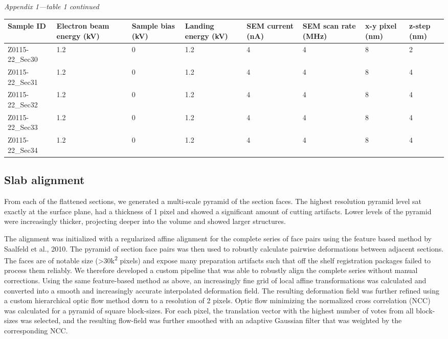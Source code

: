 \documentclass{article}
\begin{document}
\noindent\emph{Appendix 1—table 1 continued}
\begin{center}\footnotesize
\begin{longtable}{p{1.3cm}p{1.3cm}p{1.1cm}p{1.2cm}p{1.2cm}p{1.3cm}p{1cm}p{0.9cm}}
\textbf{Sample ID} & \textbf{Electron beam energy (kV)} & \textbf{Sample bias (kV)} & \textbf{Landing energy (kV)} & \textbf{SEM current (nA)} & \textbf{SEM scan rate (MHz)} & \textbf{x-y pixel (nm)} & \textbf{z-step (nm)} \\
\hline
Z0115-22\_Sec30 & 1.2 & 0 & 1.2 & 4 & 4 & 8 & 2 \\
Z0115-22\_Sec31 & 1.2 & 0 & 1.2 & 4 & 4 & 8 & 4 \\
Z0115-22\_Sec32 & 1.2 & 0 & 1.2 & 4 & 4 & 8 & 4 \\
Z0115-22\_Sec33 & 1.2 & 0 & 1.2 & 4 & 4 & 8 & 4 \\
Z0115-22\_Sec34 & 1.2 & 0 & 1.2 & 4 & 4 & 8 & 4 \\
\end{longtable}
\end{center}

\subsection*{Slab alignment}

From each of the flattened sections, we generated a multi-scale pyramid of the section faces. The highest resolution pyramid level sat exactly at the surface plane, had a thickness of 1 pixel and showed a significant amount of cutting artifacts. Lower levels of the pyramid were increasingly thicker, projecting deeper into the volume and showed larger structures.

The alignment was initialized with a regularized affine alignment for the complete series of face pairs using the feature based method by Saalfeld et al., 2010. The pyramid of section face pairs was then used to robustly calculate pairwise deformations between adjacent sections. The faces are of notable size (>30k\textsuperscript{2} pixels) and expose many preparation artifacts such that off the shelf registration packages failed to process them reliably. We therefore developed a custom pipeline that was able to robustly align the complete series without manual corrections. Using the same feature-based method as above, an increasingly fine grid of local affine transformations was calculated and converted into a smooth and increasingly accurate interpolated deformation field. The resulting deformation field was further refined using a custom hierarchical optic flow method down to a resolution of 2 pixels. Optic flow minimizing the normalized cross correlation (NCC) was calculated for a pyramid of square block-sizes. For each pixel, the translation vector with the highest number of votes from all block-sizes was selected, and the resulting flow-field was further smoothed with an adaptive Gaussian filter that was weighted by the corresponding NCC.
\end{document}
